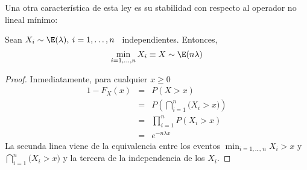 Una otra caracter\'istica de esta ley  es su stabilidad con respecto al operador
no lineal m\'inimo:
%
\begin{lema}
\label{Lem:MP:StabilidadExponencialMinimo}
%
  Sean  $X_i \sim \E(\lambda), \: i = 1, \ldots , n$ \  independientes. Entonces,
  \[
  \min_{i=1,\ldots,n} X_i \equiv X \sim \E(n \lambda)
  \]
\end{lema}
%
\begin{proof}
Inmediatamente, para cualquier $x \ge 0$
%
\begin{eqnarray*}
1-F_X(x) & = & P(X > x) \\[2mm]
%
& = & P\left( \bigcap_{i=1}^n \big( X_i > x \big) \right)\\[2mm]
%
& = & \prod_{i=1}^n P(X_i > x)\\[2mm]
%
& = & e^{- n \lambda x}
\end{eqnarray*}
%
La   secunda   linea   viene   de   la  equivalencia   entre   los   eventos   $
\min_{i=1,\ldots,n}  X_i >  x$ y  $\bigcap_{i=1}^n  \big( X_i  > x  \big)$ y  la
tercera de la independencia de los $X_i$.
\end{proof}